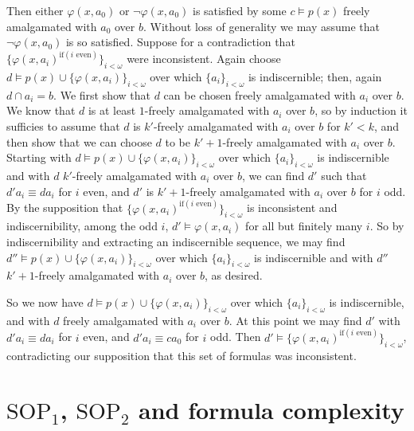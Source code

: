 \documentclass[10pt,a4paper]{amsart}
\begin{document}
    
    Then either $\varphi(x, a_{0})$ or $\neg\varphi(x, a_{0})$ is satisfied by some $c \models p(x)$ freely amalgamated with $a_{0}$ over $b$. Without loss of generality we may assume that $\neg \varphi(x, a_{0})$ is so satisfied. Suppose for a contradiction that $\{\varphi(x, a_{i})^{\text{if}(i \text{ even})} \}_{ i < \omega}$ were inconsistent. Again choose $d \models p(x) \cup \{\varphi(x, a_{i})\}_{ i < \omega}$ over which $\{a_{i}\}_{i< \omega}$ is indiscernible; then, again $d \cap a_{i} = b$. We first show that $d$ can be chosen freely amalgamated with $a_{i}$ over $b$. We know that $d$ is at least $1$-freely amalgamated with $a_{i}$ over $b$, so by induction it sufficies to assume that $d$ is $k'$-freely amalgamated with $a_{i}$ over $b$ for $k' < k$, and then show that we can choose $d$ to be $k'+1$-freely amalgamated with $a_{i}$ over $b$. Starting with $d \models p(x) \cup \{\varphi(x, a_{i})\}_{ i < \omega}$ over which $\{a_{i}\}_{i< \omega}$ is indiscernible and with $d$ $k'$-freely amalgamated with $a_{i}$ over $b$, we can find $d'$ such that $d'a_{i} \equiv da_{i}$ for $i$ even, and $d'$ is $k'+1$-freely amalgamated with $a_{i}$ over $b$ for $i$ odd. By the supposition that $\{\varphi(x, a_{i})^{\text{if}(i \text{ even})} \}_{ i < \omega}$ is inconsistent and indiscernibility, among the odd $i$, $d' \models \varphi(x, a_{i})$ for all but finitely many $i$. So by indiscernibility and extracting an indiscernible sequence, we may find $d'' \models p(x) \cup \{\varphi(x, a_{i})\}_{ i < \omega}$ over which $\{a_{i}\}_{i< \omega}$ is indiscernible and with $d''$ $k'+1$-freely amalgamated with $a_{i}$ over $b$, as desired.

    So we now have $d \models p(x) \cup \{\varphi(x, a_{i})\}_{ i < \omega}$ over which $\{a_{i}\}_{i< \omega}$ is indiscernible, and with $d$ freely amalgamated with $a_{i}$ over $b$. At this point we may find $d'$ with $d'a_{i} \equiv da_{i}$ for $i$ even, and $d'a_{i} \equiv c a_{0}$ for $i $ odd. Then $d' \models \{\varphi(x, a_{i})^{\text{if}(i \text{ even})} \}_{ i < \omega} $, contradicting our supposition that this set of formulas was inconsistent.

\section{ $\mathrm{SOP}_{1}$, $ \mathrm{SOP}_{2}$ and formula complexity}\label{formula complexity sop1 sop2}
\end{document}
